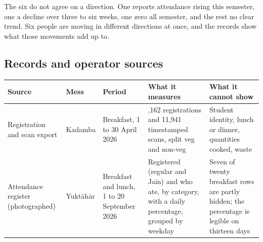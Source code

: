 \documentclass[
  10pt,
  table]{article}
\newcounter{none} %
\begin{document}
The six do not agree on a direction. One reports attendance rising this semester, one a decline over three to six weeks, one zero all semester, and the rest no clear trend. Six people are moving in different directions at once, and the records show what those movements add up to.

\subsection{Records and operator sources}\label{records-and-operator-sources}

{\def\LTcaptype{none} %
\begin{longtable}[]{@{}
  >{\raggedright\arraybackslash}p{}
  >{\raggedright\arraybackslash}p{}
  >{\raggedright\arraybackslash}p{}
  >{\raggedright\arraybackslash}p{}
  >{\raggedright\arraybackslash}p{}@{}}
\toprule\noalign{}
\begin{minipage}[b]{\linewidth}\raggedright
\cellcolor{pblue}\color{white}\bfseries Source
\end{minipage} & \begin{minipage}[b]{\linewidth}\raggedright
\cellcolor{pblue}\color{white}\bfseries Mess
\end{minipage} & \begin{minipage}[b]{\linewidth}\raggedright
\cellcolor{pblue}\color{white}\bfseries Period
\end{minipage} & \begin{minipage}[b]{\linewidth}\raggedright
\cellcolor{pblue}\color{white}\bfseries What it measures
\end{minipage} & \begin{minipage}[b]{\linewidth}\raggedright
\cellcolor{pblue}\color{white}\bfseries What it cannot show
\end{minipage} \\
\midrule\noalign{}
\endhead
\bottomrule\noalign{}
\endlastfoot
Registration and scan export & Kadamba & Breakfast, 1 to 30 April 2026 & 32,162 registrations and 11,941 timestamped scans, split veg and non-veg & Student identity, lunch or dinner, quantities cooked, waste \\
Attendance register (photographed) & Yuktāhār & Breakfast and lunch, 1 to 20 September 2026 & Registered (regular and Jain) and who ate, by category, with a daily percentage, grouped by weekday & Seven of twenty breakfast rows are partly hidden; the percentage is legible on thirteen days \\

\end{longtable}}
\end{document}
